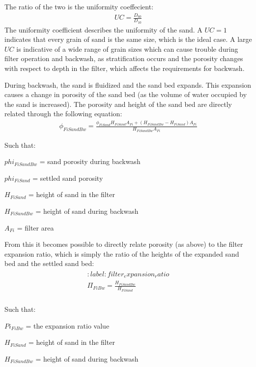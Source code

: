 \documentclass[letterpaper,10pt,english]{sphinxmanual}
\begin{document}
The ratio of the two is the uniformity coeffecient:
\begin{equation}\label{equation:Filtration/Filtration_Design:uniformity_coefficient}
\begin{split} UC = \frac{D_{60}}{D_{10}}\end{split}
\end{equation}
The uniformity coefficient describes the uniformity of the sand. A \(UC = 1\) indicates that every grain of sand is the same size, which is the ideal case. A large \(UC\) is indicative of a wide range of grain sizes which can cause trouble during filter operation and backwash, as stratification occurs and the porosity changes with respect to depth in the filter, which affects the requirements for backwash.

During backwash, the sand is fluidized and the sand bed expands. This expansion causes a change in porosity of the sand bed (as the volume of water occupied by the sand is increased). The porosity and height of the sand bed are directly related through the following equation:
\begin{equation}\label{equation:Filtration/Filtration_Design:backwash_porosity}
\begin{split} \phi_{FiSandBw} = \frac{\phi_{FiSand} H_{FiSand} A_{Fi} + \left( H_{FiSandBw} - H_{FiSand} \right) A_{Fi}}{H_{FiSandBw} A_{Fi}}\end{split}
\end{equation}
\begin{DUlineblock}{0em}
\item[] Such that:
\item[] \(phi_{FiSandBw}\) = sand porosity during backwash
\item[] \(phi_{FiSand}\) = settled sand porosity
\item[] \(H_{FiSand}\) = height of sand in the filter
\item[] \(H_{FiSandBw}\) = height of sand during backwash
\item[] \(A_{Fi}\) = filter area
\end{DUlineblock}

From this it becomes possible to directly relate porosity (as above) to the filter expansion ratio, which is simply the ratio of the heights of the expanded sand bed and the settled sand bed:
\begin{align}\label{equation:Filtration/Filtration_Design:Filtration/Filtration_Design:0}\!\begin{aligned}
:label: filter_expansion_ratio\\
\Pi_{FiBw} = \frac{H_{FiSandBw}}{H_{FiSand}}\\
\end{aligned}\end{align}
\begin{DUlineblock}{0em}
\item[] Such that:
\item[] \(Pi_{FiBw}\) = the expansion ratio value
\item[] \(H_{FiSand}\) = height of sand in the filter
\item[] \(H_{FiSandBw}\) = height of sand during backwash
\end{DUlineblock}
\end{document}
